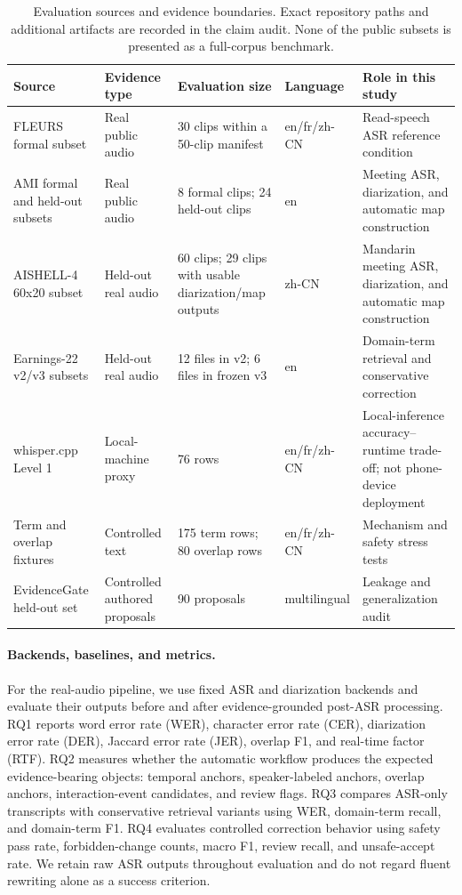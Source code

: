 \documentclass[10pt,twocolumn]{article}
\begin{document}
\begin{table}[t]
\centering
\scriptsize
\begin{tabular}{p{}p{}p{}p{}p{}}
\toprule
Source & Evidence type & Evaluation size & Language & Role in this study \\
\midrule
FLEURS formal subset & Real public audio & 30 clips within a 50-clip manifest & en/fr/zh-CN & Read-speech ASR reference condition \\
AMI formal and held-out subsets & Real public audio & 8 formal clips; 24 held-out clips & en & Meeting ASR, diarization, and automatic map construction \\
AISHELL-4 60x20 subset & Held-out real audio & 60 clips; 29 clips with usable diarization/map outputs & zh-CN & Mandarin meeting ASR, diarization, and automatic map construction \\
Earnings-22 v2/v3 subsets & Held-out real audio & 12 files in v2; 6 files in frozen v3 & en & Domain-term retrieval and conservative correction \\
whisper.cpp Level 1 & Local-machine proxy & 76 rows & en/fr/zh-CN & Local-inference accuracy--runtime trade-off; not phone-device deployment \\
Term and overlap fixtures & Controlled text & 175 term rows; 80 overlap rows & en/fr/zh-CN & Mechanism and safety stress tests \\
EvidenceGate held-out set & Controlled authored proposals & 90 proposals & multilingual & Leakage and generalization audit \\
\bottomrule
\end{tabular}
\caption{Evaluation sources and evidence boundaries. Exact repository paths and additional artifacts are recorded in the claim audit. None of the public subsets is presented as a full-corpus benchmark.}
\label{tab:exp_data}
\end{table}

\paragraph{Backends, baselines, and metrics.}
For the real-audio pipeline, we use fixed ASR and diarization backends and evaluate their outputs before and after evidence-grounded post-ASR processing. RQ1 reports word error rate (WER), character error rate (CER), diarization error rate (DER), Jaccard error rate (JER), overlap F1, and real-time factor (RTF). RQ2 measures whether the automatic workflow produces the expected evidence-bearing objects: temporal anchors, speaker-labeled anchors, overlap anchors, interaction-event candidates, and review flags. RQ3 compares ASR-only transcripts with conservative retrieval variants using WER, domain-term recall, and domain-term F1. RQ4 evaluates controlled correction behavior using safety pass rate, forbidden-change counts, macro F1, review recall, and unsafe-accept rate. We retain raw ASR outputs throughout evaluation and do not regard fluent rewriting alone as a success criterion.
\end{document}
